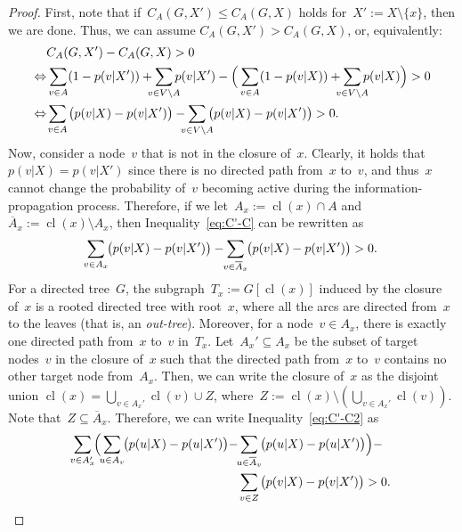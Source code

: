 \documentclass{article}
\DeclareMathOperator{\cl}{cl}
\begin{document}
\begin{proof}
  First, note that if~$C_A(G,X')\leq C_A(G,X)$ holds for~$X':=X\setminus\{x\}$,
  then we are done. Thus, we can assume $C_A(G,X') >
  C_A(G,X)$, or, equivalently:
  \begin{align}
    &C_A(G,X') - C_A(G,X) > 0\nonumber \\
    \Leftrightarrow &\sum_{v \in A}(1-p(v|X'))+\smashoperator{\sum_{v \in V\setminus
        A}}p(v|X') - \Big(\sum_{v \in
      A}(1-p(v|X))+\smashoperator{\sum_{v \in V\setminus
        A}}p(v|X)\Big) > 0\nonumber \\
    \Leftrightarrow &\smashoperator{\sum_{v \in A}}\big(p(v|X)-p(v|X')\big) - \smashoperator{\sum_{v \in V\setminus A}}\big(p(v|X) - p(v|X')\big) > 0.\label{eq:C'-C}
  \end{align}
  Now, consider a node~$v$ that is not in the closure
  of~$x$. Clearly, it holds that~$p(v|X)=p(v|X')$ since there is no directed path
  from~$x$ to~$v$, and thus~$x$ cannot change the 
  probability of~$v$ becoming active during the information-propagation process.
  Therefore, if we let~$A_x := \cl(x)\cap A$ and~$\overline{A}_x :=\cl(x)\setminus A_x$,
  then Inequality~\eqref{eq:C'-C} can be rewritten as
  \begin{align}
    \smashoperator{\sum_{v \in A_x}}\big(p(v|X)-p(v|X')\big)-\smashoperator{\sum_{v \in
    \overline{A}_x}}\big(p(v|X) - p(v|X')\big) > 0.\label{eq:C'-C2}
  \end{align}
  For a directed tree~$G$, the subgraph~$T_x:=G[\cl(x)]$ induced by the
  closure of~$x$ is a rooted directed tree with root~$x$,
  where all the arcs are directed from~$x$ to the leaves (that is, an
  \emph{out-tree}).
  Moreover, for a node~$v\in A_x$, there is exactly one directed path
  from~$x$ to~$v$ in~$T_x$. Let~$A_x'\subseteq A_x$ be the subset of target
  nodes~$v$ in the closure of~$x$ such that the directed path from~$x$ to~$v$
  contains no other target node from~$A_x$.
  Then, we can write the closure of~$x$ as the disjoint union
  $\cl(x) = \bigcup_{v\in A_x'}\cl(v) \cup Z$,
  where~$Z:=\cl(x)\setminus(\bigcup_{v\in A_x'}\cl(v))$.
  Note that~$Z\subseteq\overline{A}_x$.
  Therefore, we can write Inequality~\eqref{eq:C'-C2} as
  \begin{align*}
    \smashoperator{\sum_{v\in A_x'}}\Big(\smashoperator{\sum_{u \in
        A_v}}\big(p(u|X)-p(u|X')\big)-
    &\smashoperator{\sum_{u \in
    \overline{A}_v}}\big(p(u|X) - p(u|X')\big)\Big) -\\
    &\smashoperator{\sum_{v\in Z}}\big(p(v|X)-p(v|X')\big) > 0.
  \end{align*}

\end{proof}
\end{document}
